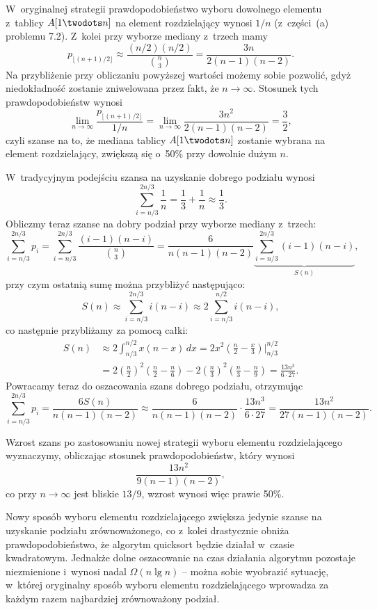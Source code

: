 \subproblem %
W~oryginalnej strategii prawdopodobieństwo wyboru dowolnego elementu z~tablicy $A[1\twodots n]$ na element rozdzielający wynosi $1/n$ (z~części~(a) problemu 7.2). Z~kolei przy wyborze mediany z~trzech mamy
\[
	p_{\lfloor(n+1)/2\rfloor} \approx \frac{(n/2)(n/2)}{\binom{n}{3}} = \frac{3n}{2(n-1)(n-2)}.
\]
Na przybliżenie przy obliczaniu powyższej wartości możemy sobie pozwolić, gdyż niedokładność zostanie zniwelowana przez fakt, że $n\to\infty$. Stosunek tych prawdopodobieństw wynosi
\[
	\lim_{n\to\infty}\frac{p_{\lfloor(n+1)/2\rfloor}}{1/n} = \lim_{n\to\infty}\frac{3n^2}{2(n-1)(n-2)} = \frac{3}{2},
\]
czyli szanse na to, że mediana tablicy $A[1\twodots n]$ zostanie wybrana na element rozdzielający, zwiększą się o~50\% przy dowolnie dużym $n$.

\subproblem %
W~tradycyjnym podejściu szansa na uzyskanie dobrego podziału wynosi
\[
	\sum_{i=n/3}^{2n/3}\frac{1}{n} = \frac{1}{3}+\frac{1}{n} \approx \frac{1}{3}.
\]
Obliczmy teraz szanse na dobry podział przy wyborze mediany z~trzech:
\[
	\sum_{i=n/3}^{2n/3}p_i = \sum_{i=n/3}^{2n/3}\frac{(i-1)(n-i)}{\binom{n}{3}} = \frac{6}{n(n-1)(n-2)}\underbrace{\sum_{i=n/3}^{2n/3}(i-1)(n-i)}_{S(n)},
\]
przy czym ostatnią sumę można przybliżyć następująco:
\[
	S(n) \approx \sum_{i=n/3}^{2n/3}i(n-i) \approx 2\sum_{i=n/3}^{n/2}i(n-i),
\]
co następnie przybliżamy za pomocą całki:
\begin{align*}
	S(n) &\approx 2\int_{n/3}^{n/2}x(n-x)\,dx = 2x^2\left(\frac{n}{2}-\frac{x}{3}\right)\Big|_{n/3}^{n/2} \\
	&= 2\left(\frac{n}{2}\right)^2\left(\frac{n}{2}-\frac{n}{6}\right)-2\left(\frac{n}{3}\right)^2\left(\frac{n}{3}-\frac{n}{9}\right) = \frac{13n^3}{6\cdot27}.
\end{align*}
Powracamy teraz do oszacowania szans dobrego podziału, otrzymując
\[
	\sum_{i=n/3}^{2n/3}p_i = \frac{6S(n)}{n(n-1)(n-2)} \approx \frac{6}{n(n-1)(n-2)}\cdot\frac{13n^3}{6\cdot27} = \frac{13n^2}{27(n-1)(n-2)}.
\]

Wzrost szans po zastosowaniu nowej strategii wyboru elementu rozdzielającego wyznaczymy, obliczając stosunek prawdopodobieństw, który wynosi
\[
	\frac{13n^2}{9(n-1)(n-2)},
\]
co przy $n\to\infty$ jest bliskie $13/9$, wzrost wynosi więc prawie 50\%.

\subproblem %
Nowy sposób wyboru elementu rozdzielającego zwiększa jedynie szanse na uzyskanie podziału zrównoważonego, co z~kolei drastycznie obniża prawdopodobieństwo, że algorytm quicksort będzie działał w~czasie kwadratowym. Jednakże dolne oszacowanie na czas działania algorytmu pozostaje niezmienione i~wynosi nadal $\Omega(n\lg n)$ -- można sobie wyobrazić sytuację, w~której oryginalny sposób wyboru elementu rozdzielającego wprowadza za każdym razem najbardziej zrównoważony podział.


\subproblem %
\subproblem %

\endinput
